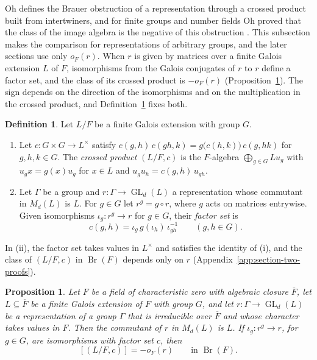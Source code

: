 \documentclass[a4paper,11pt]{amsart}
\newtheorem{proposition}[theorem]{Proposition}
\theoremstyle{definition}
\newtheorem{definition}[theorem]{Definition}
\theoremstyle{remark}
\numberwithin{equation}{section}
\DeclareMathOperator{\Br}{Br}
\DeclareMathOperator{\GL}{GL}
\begin{document}
Oh defines the Brauer obstruction of a representation through a crossed product built from intertwiners, and for finite groups and number fields Oh proved that the class of the image algebra is the negative of this obstruction \cite[\S2, Theorem~1]{Oh16}. This subsection makes the comparison for representations of arbitrary groups, and the later sections use only $o_F(r)$. When $r$ is given by matrices over a finite Galois extension $L$ of $F$, isomorphisms from the Galois conjugates of $r$ to $r$ define a factor set, and the class of its crossed product is $-o_F(r)$ (Proposition~\ref{prop:intertwiner-sign}). The sign depends on the direction of the isomorphisms and on the multiplication in the crossed product, and Definition~\ref{def:factor-set} fixes both.

\begin{definition}\label{def:factor-set}
Let $L/F$ be a finite Galois extension with group $G$.
\begin{enumerate}
\item[(i)] Let $c\colon G\times G\to L^\times$ satisfy $c(g,h)\,c(gh,k)=g\bigl(c(h,k)\bigr)\,c(g,hk)$ for $g,h,k\in G$. The \emph{crossed product} $(L/F,c)$ is the $F$-algebra $\bigoplus_{g\in G}Lu_g$ with $u_gx=g(x)u_g$ for $x\in L$ and $u_gu_h=c(g,h)\,u_{gh}$.
\item[(ii)] Let $\Gamma$ be a group and $r\colon\Gamma\to\GL_d(L)$ a representation whose commutant in $M_d(L)$ is $L$. For $g\in G$ let $r^g=g\circ r$, where $g$ acts on matrices entrywise. Given isomorphisms $\iota_g\colon r^g\to r$ for $g\in G$, their \emph{factor set} is
\[
 c(g,h)=\iota_g\,g(\iota_h)\,\iota_{gh}^{-1}\qquad(g,h\in G).
\]
\end{enumerate}
\end{definition}

In (ii), the factor set takes values in $L^\times$ and satisfies the identity of (i), and the class of $(L/F,c)$ in $\Br(F)$ depends only on $r$ (Appendix~\ref{app:section-two-proofs}).

\begin{proposition}\label{prop:intertwiner-sign}
Let $F$ be a field of characteristic zero with algebraic closure $\overline F$, let $L\subseteq\overline F$ be a finite Galois extension of $F$ with group $G$, and let $r\colon\Gamma\to\GL_d(L)$ be a representation of a group $\Gamma$ that is irreducible over $\overline F$ and whose character takes values in $F$. Then the commutant of $r$ in $M_d(L)$ is $L$. If $\iota_g\colon r^g\to r$, for $g\in G$, are isomorphisms with factor set $c$, then
\[
 [(L/F,c)]=-o_F(r)\qquad\text{in }\Br(F).
\]
\end{proposition}
\end{document}
